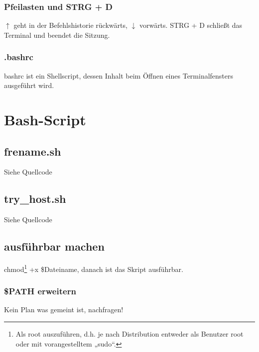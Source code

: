 \documentclass[]{scrartcl}
\begin{document}
\subsubsection*{Pfeilasten und STRG + D}
$\uparrow$ geht in der Befehlshistorie rückwärts, $\downarrow$ vorwärts. STRG + D schließt das Terminal und beendet die Sitzung.

\subsubsection*{.bashrc}
bashrc ist ein Shellscript, dessen Inhalt beim Öffnen eines Terminalfensters ausgeführt wird.

\section{Bash-Script}
\subsection{frename.sh}
Siehe Quellcode

\subsection{try\_host.sh}
Siehe Quellcode

\subsection{ausführbar machen}
chmod\footnote{Als root auszuführen, d.h. je nach Distribution entweder als Benutzer root oder mit vorangestelltem „sudo“.} +x \$Dateiname, danach ist das Skript ausführbar.

\subsubsection{\$PATH erweitern}
Kein Plan was gemeint ist, nachfragen!
\end{document}
